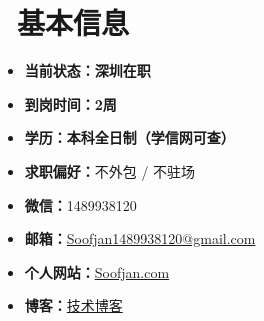 \documentclass{resume}
\begin{document}


\section{\faInfoCircle\ 基本信息}
\vspace{0.5ex}
\begin{minipage}[t]{0.48\textwidth}
\begin{itemize}[label=,leftmargin=*]
\large
\item \textbf{当前状态：}\textbf{深圳在职}
\item \textbf{到岗时间：}\textbf{2周}
\item \textbf{学历：}\textbf{本科全日制（学信网可查）}
\item \textbf{求职偏好：}不外包 / 不驻场
\end{itemize}
\end{minipage}\hfill
\begin{minipage}[t]{0.48\textwidth}
\begin{itemize}[label=,leftmargin=*]
\large
\item \textbf{微信：}1489938120
\item \textbf{邮箱：}\href{mailto:Soofjan1489938120@gmail.com}{Soofjan1489938120@gmail.com}
\item \textbf{个人网站：}\href{https://Soofjan.com}{Soofjan.com}
\item \textbf{博客：}\href{https://juejin.cn/user/4074147977125020}{技术博客}
\end{itemize}
\end{minipage}
\end{document}
